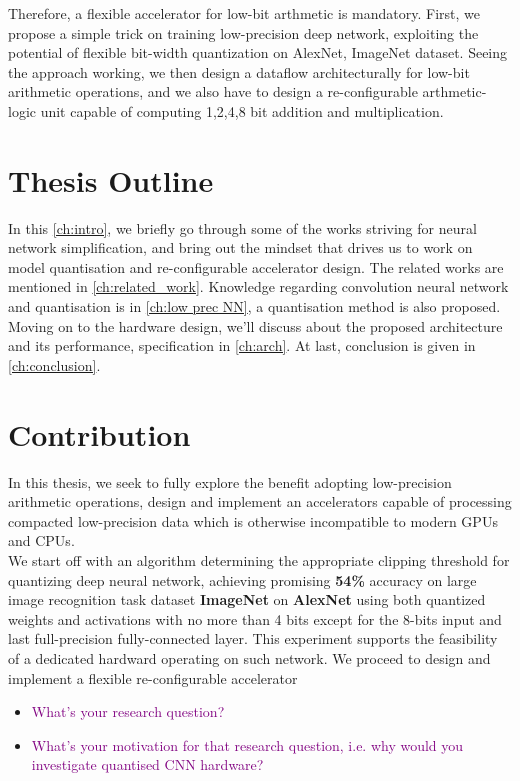 Therefore, a flexible accelerator for low-bit arthmetic is mandatory. First, we propose a simple trick on training low-precision deep network, exploiting the potential of flexible bit-width quantization on AlexNet, ImageNet dataset. Seeing the approach working, we then design a dataflow architecturally for low-bit arithmetic operations, and we also have to design a re-configurable arthmetic-logic unit capable of computing 1,2,4,8 bit addition and multiplication. 
\section{Thesis Outline}
In this \autoref{ch:intro}, we briefly go through some of the works striving for neural network simplification, and bring out the mindset that drives us to work on model quantisation and re-configurable accelerator design. The related works are mentioned in \autoref{ch:related_work}. Knowledge regarding convolution neural network and quantisation is in \autoref{ch:low prec NN}, a quantisation method is also proposed. Moving on to the hardware design, we'll discuss about the proposed architecture and its performance, specification in \autoref{ch:arch}. At last, conclusion is given in \autoref{ch:conclusion}.  
\section{Contribution}
In this thesis, we seek to fully explore the benefit adopting low-precision arithmetic operations, design and implement an accelerators capable of processing compacted low-precision data which is otherwise incompatible to modern GPUs and CPUs. \\
We start off with an algorithm determining the appropriate clipping threshold for quantizing deep neural network, achieving promising \textbf{54\%} accuracy on large image recognition task dataset \textbf{ImageNet} on \textbf{AlexNet} using both quantized weights and activations with no more than 4 bits except for the 8-bits input and last full-precision fully-connected layer. This experiment supports the feasibility of a dedicated hardward operating on such network. We proceed to design and implement a flexible re-configurable accelerator 


\begin{itemize}
    \item \textcolor{purple}{What's your research question?}
    \item \textcolor{purple}{What's your motivation for that research question, i.e. why would you investigate quantised CNN hardware?}
\end{itemize}
